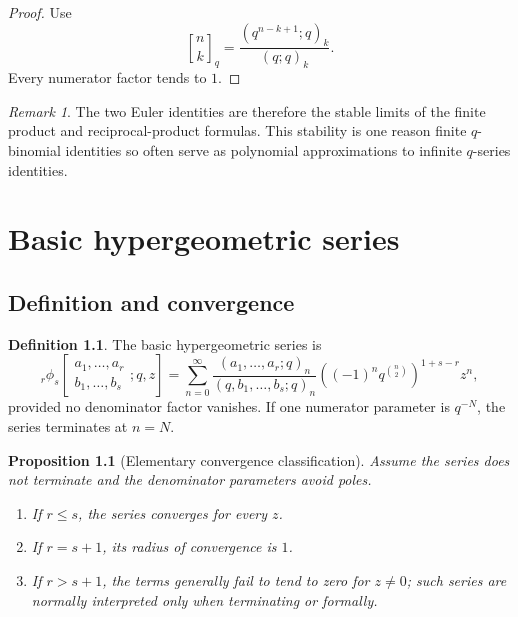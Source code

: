 \documentclass[11pt,oneside,openany]{book}
\newtheorem{proposition}[theorem]{Proposition}
\theoremstyle{definition}
\newtheorem{definition}[theorem]{Definition}
\theoremstyle{remark}
\newtheorem{remark}[theorem]{Remark}
\newcommand{\qbinom}[2]{\genfrac{[}{]}{0pt}{}{#1}{#2}_{q}}
\begin{document}
\begin{proof}
Use
\[
 \qbinom nk=\frac{(q^{n-k+1};q)_k}{(q;q)_k}.
\]
Every numerator factor tends to $1$.
\end{proof}

\begin{remark}
The two Euler identities are therefore the stable limits of the finite product and reciprocal-product formulas.  This stability is one reason finite $q$-binomial identities so often serve as polynomial approximations to infinite $q$-series identities.
\end{remark}

\chapter{Basic hypergeometric series}\label{chap:basic-hypergeometric}

\section{Definition and convergence}

\begin{definition}
The basic hypergeometric series is
\[
 {}_r\phi_s\!\left[
 \begin{matrix}a_1,\dots,a_r\\ b_1,\dots,b_s\end{matrix};q,z\right]
 =\sum_{n=0}^{\infty}
 \frac{(a_1,\dots,a_r;q)_n}{(q,b_1,\dots,b_s;q)_n}
 \left((-1)^nq^{\binom n2}\right)^{1+s-r}z^n,
\]
provided no denominator factor vanishes.  If one numerator parameter is $q^{-N}$, the series terminates at $n=N$.
\end{definition}

\begin{proposition}[Elementary convergence classification]\label{prop:phi-convergence}
Assume the series does not terminate and the denominator parameters avoid poles.
\begin{enumerate}[label=\textup{(\roman*)}]
\item If $r\le s$, the series converges for every $z$.
\item If $r=s+1$, its radius of convergence is $1$.
\item If $r>s+1$, the terms generally fail to tend to zero for $z\ne0$; such series are normally interpreted only when terminating or formally.
\end{enumerate}
\end{proposition}
\end{document}
